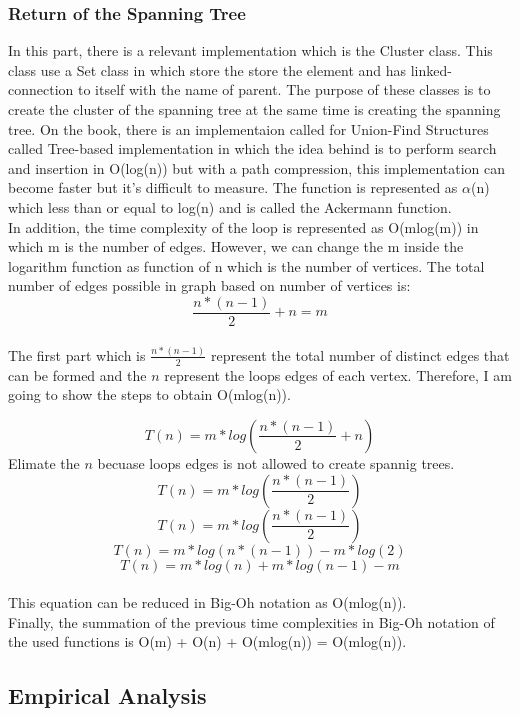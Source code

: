 \documentclass{article}
\begin{document}
\subsubsection{Return of the Spanning Tree}
In this part, there is a relevant implementation which is the Cluster class. This class use a Set class in which store the store the element and has linked-connection to itself with the name of parent. The purpose of these classes is to create the cluster of the spanning tree at the same time is creating the spanning tree. On the book, there is an implementaion called for Union-Find Structures called Tree-based implementation in which the idea behind is to perform search and insertion in O(log(n)) but with a path compression, this implementation can become faster but it's difficult to measure. The function is represented as $\alpha$(n) which less than or equal to log(n) and is called the Ackermann function.\\
In addition, the time complexity of the loop is represented as O(mlog(m)) in which m is the number of edges. However, we can change the m inside the logarithm function as function of n which is the number of vertices. The total number of edges possible in graph based on number of vertices is:\\

$$  \frac{n*(n-1)}{2} + n = m$$\\
The first part which is $\frac{n*(n-1)}{2} $ represent the total number of distinct edges that can be formed and the $n$ represent the loops edges of each vertex. Therefore, I am going to show the steps to obtain O(mlog(n)).

$$ T(n) = m*log(\frac{n*(n-1)}{2} + n)$$
Elimate the $n$ becuase loops edges is not allowed to create spannig trees.
$$ T(n) = m*log(\frac{n*(n-1)}{2})$$
$$ T(n) = m*log(\frac{n*(n-1)}{2})$$
$$ T(n) = m*log(n*(n-1)) - m*log(2)$$
$$ T(n) = m*log(n) + m*log(n-1) - m$$\\

This equation can be reduced in Big-Oh notation as O(mlog(n)).\\

Finally, the summation of the previous time complexities in Big-Oh notation of the used functions is O(m) + O(n) + O(mlog(n)) = O(mlog(n)).


\subsection{Empirical Analysis}
\end{document}
